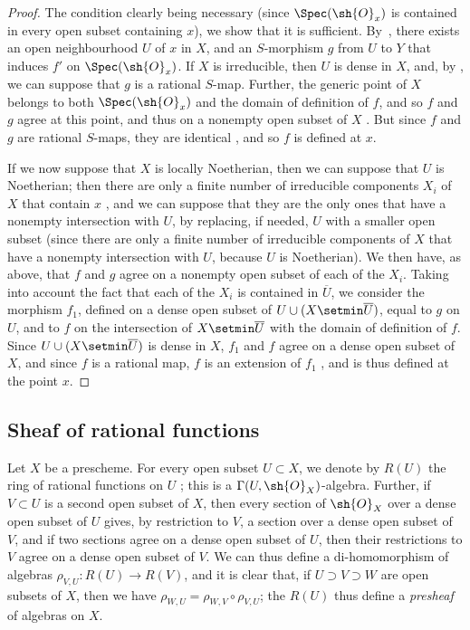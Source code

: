 \begin{proof}
The condition clearly being necessary (since $\Spec(\sh{O}_x)$ is contained in every open subset containing $x$), we show that it is sufficient.
By~, there exists an open neighbourhood $U$ of $x$ in $X$, and an $S$-morphism $g$ from $U$ to $Y$ that induces $f'$ on $\Spec(\sh{O}_x)$.
If $X$ is irreducible, then $U$ is dense in $X$, and, by , we can suppose that $g$ is a rational $S$-map.
Further, the generic point of $X$ belongs to both $\Spec(\sh{O}_x)$ and the domain of definition of $f$, and so $f$ and $g$ agree at this point, and thus on a nonempty open subset of $X$ .
But since $f$ and $g$ are rational $S$-maps, they are identical , and so $f$ is defined at $x$.

If we now suppose that $X$ is locally Noetherian, then we can suppose that $U$ is Noetherian; then there are only a finite number of irreducible components $X_i$ of $X$ that contain $x$ , and we can suppose that they are the only ones that have a nonempty intersection with $U$, by replacing, if needed, $U$ with a smaller open subset (since there are only a finite number of irreducible components of $X$ that have a nonempty intersection with $U$, because $U$ is Noetherian).
We then have, as above, that $f$ and $g$ agree on a nonempty open subset of each of the $X_i$.
Taking into account the fact that each of the $X_i$ is contained in $\overline{U}$, we consider the morphism $f_1$, defined on a dense open subset of $U\cup(X\setmin\overline{U})$, equal to $g$ on $U$, and to $f$ on the intersection of $X\setmin\overline{U}$ with the domain of definition of $f$.
Since $U\cup(X\setmin\overline{U})$ is dense in $X$, $f_1$ and $f$ agree on a dense open subset of $X$, and since $f$ is a rational map, $f$ is an extension of $f_1$ , and is thus defined at the point $x$.
\end{proof}

\subsection{Sheaf of rational functions}
\label{subsection:I.7.3}

\begin{env}[7.3.1]
\label{I.7.3.1}
Let $X$ be a prescheme.
For every open subset $U\subset X$, we denote by $R(U)$ the ring of rational functions on $U$ ; this is a $\Gamma(U,\sh{O}_X)$-algebra.
Further, if $V\subset U$ is a second open subset of $X$, then every section of $\sh{O}_X$ over a dense open subset of $U$ gives, by restriction to $V$, a section over a dense open subset of $V$, and if two sections agree on a dense open subset of $U$, then their restrictions to $V$ agree on a dense open subset of $V$.
We can thus define a di-homomorphism of algebras $\rho_{V,U}:R(U)\to R(V)$, and it is clear that, if $U\supset V\supset W$ are open subsets of $X$, then we have $\rho_{W,U}=\rho_{W,V}\circ\rho_{V,U}$; the $R(U)$ thus define a \emph{presheaf} of algebras on $X$.
\end{env}

